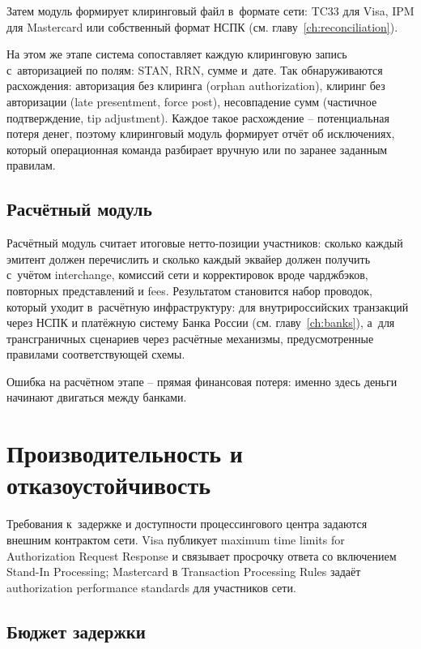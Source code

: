 Затем модуль формирует клиринговый файл в~формате сети:
TC33 для Visa, IPM для Mastercard
или собственный формат НСПК (см. главу~\ref{ch:reconciliation}).~\cite{visa-core-rules,mc-tpr,nspk-mir-rules}

На этом же этапе система сопоставляет каждую клиринговую
запись с~авторизацией по полям: STAN, RRN, сумме
и~дате. Так обнаруживаются расхождения: авторизация без
клиринга (orphan authorization), клиринг без авторизации
(late presentment, force post), несовпадение сумм
(частичное подтверждение, tip adjustment). Каждое такое расхождение --
потенциальная потеря денег, поэтому клиринговый модуль формирует
отчёт об исключениях, который операционная команда разбирает вручную
или по заранее заданным правилам.

\subsection*{Расчётный модуль}

Расчётный модуль считает итоговые нетто-позиции участников:
сколько каждый эмитент должен перечислить и сколько каждый
эквайер должен получить с~учётом interchange, комиссий сети
и корректировок вроде чарджбэков, повторных представлений и fees.
Результатом становится набор проводок, который уходит
в~расчётную инфраструктуру: для внутрироссийских транзакций
через НСПК и платёжную систему Банка России
(см. главу~\ref{ch:banks}), а~для трансграничных сценариев
через расчётные механизмы, предусмотренные правилами
соответствующей
схемы.~\cite{cbr-national-payment-system,cbr-ps,visa-core-rules,mc-switching-services}

Ошибка на расчётном этапе -- прямая финансовая потеря:
именно здесь деньги начинают двигаться между банками.

\section{Производительность и отказоустойчивость}\label{sec:pc-performance}

Требования к~задержке и доступности процессингового центра
задаются внешним контрактом сети. Visa публикует maximum time limits
for Authorization Request Response и связывает просрочку
ответа со включением Stand-In Processing; Mastercard
в Transaction Processing Rules задаёт authorization
performance standards для участников сети.~\cite{visa-core-rules,mc-tpr}

\subsection*{Бюджет задержки}

